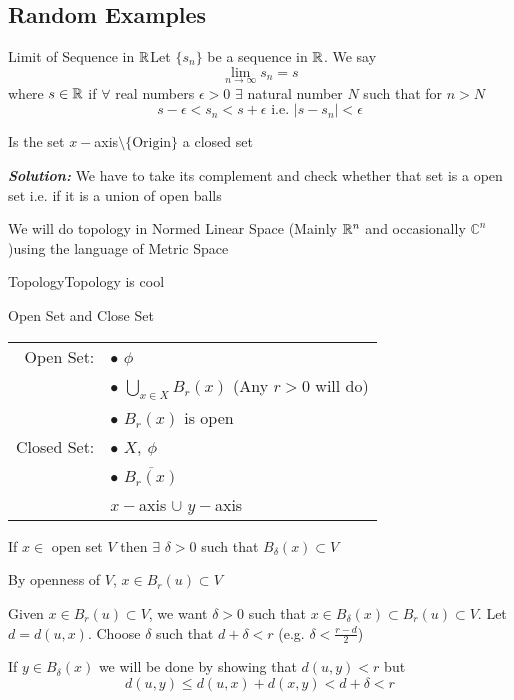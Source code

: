 \documentclass{report}
\newcommand{\thm}[2]{\begin{Theorem}{#1}{}#2\end{Theorem}}
\newcommand{\clm}[3]{\begin{claim}{#1}{#2}#3\end{claim}}
\newcommand{\ex}[2]{\begin{Example}{#1}{}#2\end{Example}}
\newcommand{\dfn}[2]{\begin{Definition}[colbacktitle=red!75!black]{#1}{}#2\end{Definition}}
\newcommand{\qs}[2]{\begin{question}{#1}{}#2\end{question}}
\newcommand{\nt}[1]{\begin{note}#1\end{note}}
\newenvironment{myproof}[1][\proofname]{%
	\proof[\bfseries #1: ]%
}{\endproof}
\newcommand{\eps}{\epsilon}
\newcommand{\bs}[1]{\boldsymbol{#1}}
\newcommand{\sol}{\setlength{\parindent}{0cm}\textbf{\textit{Solution:}}\setlength{\parindent}{1cm} }
\newcommand{\bbC}{\mathbb{C}}	\newcommand{\bbD}{\mathbb{D}}
\begin{document}
\iffalse


\chapter{}
\section{Random Examples}
\dfn{Limit of Sequence in $\bs{\bbR}$}{Let $\{s_n\}$ be a sequence in $\mathbb{R}$. We say $$\lim_{n\to\infty}s_n=s$$ where $s\in\mathbb{R}$ if $\forall$ real numbers $\eps>0$ $\exists$ natural number $N$ such that for $n>N$ $$s-\eps<s_n<s+\eps\text{ i.e. }|s-s_n|<\eps$$}
\qs{}{Is the set ${x-}$axis${\setminus\{\text{Origin}\}}$ a closed set}
\sol We have to take its complement and check whether that set is a open set i.e. if it is a union of open balls
\nt{We will do topology in Normed Linear Space  (Mainly $\mathbb{R}^n$ and occasionally $\bbC^n$)using the language of Metric Space}
\clm{Topology}{}{Topology is cool}
\ex{Open Set and Close Set}{
	\begin{tabular}{rl}
		Open Set:   & $\bullet$ $\phi$                                              \\
		            & $\bullet$ $\bigcup\limits_{x\in X}B_r(x)$ (Any $r>0$ will do) \\[3mm]
		            & $\bullet$ $B_r(x)$ is open                                    \\
		Closed Set: & $\bullet$ $X,\ \phi$                                          \\
		            & $\bullet$ $\overline{B_r(x)}$                                 \\
		            & $x-$axis $\cup$ $y-$axis
	\end{tabular}}
\thm{}{If $x\in$ open set $V$ then $\exists$ $\delta>0$ such that $B_{\delta}(x)\subset V$}
\begin{myproof}By openness of $V$, $x\in B_r(u)\subset V$
	\begin{center}
	\end{center}

	Given $x\in B_r(u)\subset V$, we want $\delta>0$ such that $x\in B_{\delta} (x)\subset B_r(u)\subset V$. Let $d=d(u,x)$. Choose $\delta $ such that $d+\delta<r$ (e.g. $\delta<\frac{r-d}{2}$)

	If $y\in B_{\delta}(x)$ we will be done by showing that $d(u,y)<r$ but $$d(u,y)\leq d(u,x)+d(x,y)<d+\delta<r$$
\end{myproof}
\end{document}
